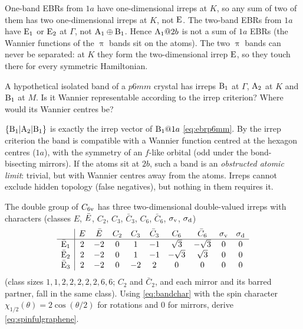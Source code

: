 \begin{solution}
One-band EBRs from $1a$ have one-dimensional irreps at $K$, so any sum of two of them
has two one-dimensional irreps at $K$, not $\mathrm{E}$. The two-band EBRs from $1a$ have
$\mathrm{E}_1$ or $\mathrm{E}_2$ at $\Gamma$, not $\mathrm{A}_1\oplus\mathrm{B}_1$. Hence $\mathrm{A}_1@2b$ is not a
sum of $1a$ EBRs (the Wannier functions of the $\uppi$ bands sit on the atoms). The two
$\uppi$ bands can never be separated: at $K$ they form the two-dimensional irrep $\mathrm{E}$,
so they touch there for every symmetric Hamiltonian.
\end{solution}

\begin{exercise}\label{ex:8:obstructed}
A hypothetical isolated band of a $p6mm$ crystal has irreps $\mathrm{B}_1$ at $\Gamma$,
$\mathrm{A}_2$ at $K$ and $\mathrm{B}_1$ at $M$. Is it Wannier representable according to the
irrep criterion? Where would its Wannier centres be?
\end{exercise}

\begin{solution}
$\{\mathrm{B}_1|\mathrm{A}_2|\mathrm{B}_1\}$ is exactly the irrep vector of $\mathrm{B}_1@1a$
\eqref{eq:ebrp6mm}. By the irrep criterion the band is compatible with a Wannier
function centred at the hexagon centres ($1a$), with the symmetry of an
$f$-like orbital (odd under the bond-bisecting mirrors). If the atoms sit at $2b$, such a
band is an \emph{obstructed atomic limit}: trivial, but with Wannier centres away from
the atoms. Irreps cannot exclude hidden topology (false negatives), but nothing in them
requires it.
\end{solution}

\begin{exercise}\label{ex:8:spinful}
The double group of $C_{6\mathrm{v}}$ has three two-dimensional double-valued irreps with
characters (classes $E$, $\bar{E}$, $C_2$, $C_3$, $\bar{C}_3$, $C_6$, $\bar{C}_6$, $\sigma_{\mathrm{v}}$, $\sigma_{\mathrm{d}}$)
\[
\begin{array}{c|ccccccccc}
 & E & \bar{E} & C_2 & C_3 & \bar{C}_3 & C_6 & \bar{C}_6 & \sigma_{\mathrm{v}} & \sigma_{\mathrm{d}}\\\hline
\bar{\mathrm{E}}_1 & 2&-2&0&1&-1&\sqrt3&-\sqrt3&0&0\\
\bar{\mathrm{E}}_2 & 2&-2&0&1&-1&-\sqrt3&\sqrt3&0&0\\
\bar{\mathrm{E}}_3 & 2&-2&0&-2&2&0&0&0&0
\end{array}
\]
(class sizes $1,1,2,2,2,2,2,6,6$; $C_2$ and $\bar{C}_2$, and each mirror and its barred
partner, fall in the same class).
Using \eqref{eq:bandchar} with the spin character $\chi_{1/2}(\theta)=2\cos(\theta/2)$
for rotations and $0$ for mirrors, derive \eqref{eq:spinfulgraphene}.
\end{exercise}

